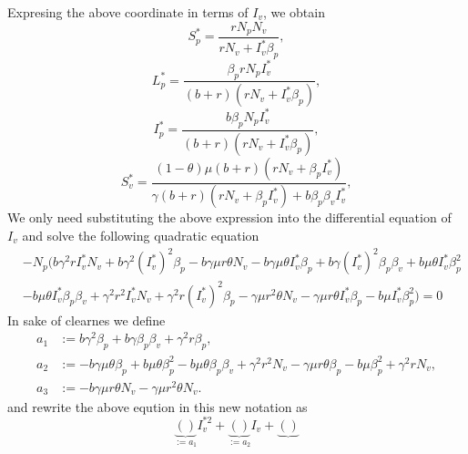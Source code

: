 %
Expresing the above coordinate in terms of $I_v$, we obtain
%
\begin{equation*}
	S^*_p = 
		\frac{
			r N_p N_v
		}{
			r N_v + 
			I ^ *_v 
			\beta_p
		},
\end{equation*}
%
%
\begin{equation*}
	L ^ *_p = 
		\frac{
			\beta_p rN_p I _ v ^ *
		}{
			\left( 
				b + r 
			\right)
			(
				r N_v + I_v ^ * 
				\beta_p
			)
		},
\end{equation*}
%
%
\begin{equation*}
	I ^*_p =
		\frac{
			b \beta_p N_p I_v ^ *
		}{
			 \left(
			 	 b + r 
			 \right)
			 ( r N_v + 
			 	I_v ^ * \beta_p
			 )
		},
\end{equation*}
%
%
\begin{equation*}
	S ^ *_v =
		\frac{
			 \left( 
			 	1 - \theta 
			 \right)
			 \mu(b + r)
			 (rN_v + \beta_p I_v^*)
		}{
			\gamma(b + r)
			(r N_v + \beta_p I^*_v) + 
			b \beta_p \beta_v I_v^*
		},
\end{equation*}
%
%
We only need substituting the above expression into the differential equation 
of $I_v$ and solve the following quadratic equation
%
\begin{equation*}
	\begin{aligned}
			&
			-N_p( 
				b \gamma^2 r I^*_v N_v + 
				b \gamma^2 (I ^*_v)^2 \beta_p -
				b \gamma \mu r \theta N_v - 
				b \gamma \mu \theta I ^ *_v \beta_p + 
				b \gamma (I^*_v)^2 \beta_p \beta_v + 
				b \mu \theta I ^ *_v \beta_p ^ 2
			\\
			&-
				b \mu \theta I ^ *_v \beta_p \beta_v +
				\gamma ^ 2 r ^ 2 I ^ *_v N_v +
				\gamma ^ 2 r (I ^ *_v) ^ 2 \beta_p - 
				\gamma\mu r^2 \theta N_v - 
				\gamma\mu r \theta I^*_v 
				\beta_p - b\mu I^*_v \beta_p^2) = 0
	\end{aligned}
\end{equation*}
% 
In sake of clearnes we define 
\begin{align*}
	a_1 &:= b \gamma^2 \beta_p+b \gamma \beta_p\beta_v+\gamma^2 r \beta_p,\\
	a_2 &:=-b\gamma\mu\theta\beta_p+b\mu\theta\beta_p^2-b\mu\theta\beta_p\beta_v+\gamma^2 r^2 N_v-\gamma\mu r \theta\beta_p-b\mu\beta_p^2+\gamma^2 r N_v,\\
	a_3 &:=-b\gamma\mu r\theta N_v-\gamma\mu r^2\theta N_v.
\end{align*}
%
and rewrite the above eqution in this new notation as
\begin{equation}
	\underbrace{
		()
	}_{:=a_1}
	I_v^{*2} + 
	\underbrace{()}_{:=a_2} I_v + 
	\underbrace{()} 
\end{equation}
